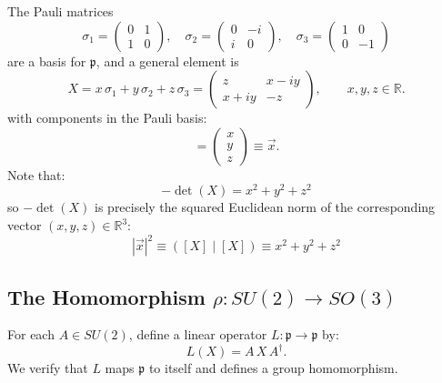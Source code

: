 \documentclass[12pt]{article}
\begin{document}
\noindent
The Pauli matrices
\begin{equation*}
  \sigma_1 = \begin{pmatrix}0&1\\1&0\end{pmatrix},\quad
  \sigma_2 = \begin{pmatrix}0&-i\\i&0\end{pmatrix},\quad
  \sigma_3 = \begin{pmatrix}1&0\\0&-1\end{pmatrix}
\end{equation*}
are a basis for $\mathfrak{p}$, and a general element is
\begin{equation*}
  X = x\,\sigma_1 + y\,\sigma_2 + z\,\sigma_3 = \begin{pmatrix} z & x-iy \\ x+iy & -z \end{pmatrix}, \qquad x,y,z \in \mathbb{R}.
\end{equation*}
with components in the Pauli basis:
\begin{equation*}
  [X]= \begin{pmatrix} x \\ y \\ z \end{pmatrix} \equiv \vec{x}.
\end{equation*}
Note that:
\begin{equation}
  \label{eqn:det-pauli}
  -\det(X) = x^2 + y^2 + z^2
\end{equation}
so $-\det(X)$ is precisely the squared Euclidean norm of the corresponding
vector $(x,y,z) \in \mathbb{R}^3$:
$$|\vec{x}|^2 \equiv ([X] \mid [X]) \equiv x^2 + y^2 + z^2 $$

\subsection*{The Homomorphism $\rho: SU(2) \to SO(3)$}

For each $A \in SU(2)$, define a linear operator $L: \mathfrak{p} \to \mathfrak{p}$ by:
\begin{equation*}
  L(X) = A\,X\,A^\dagger.
\end{equation*}
We verify that $L$ maps $\mathfrak{p}$ to itself and defines a group
homomorphism.
\end{document}

